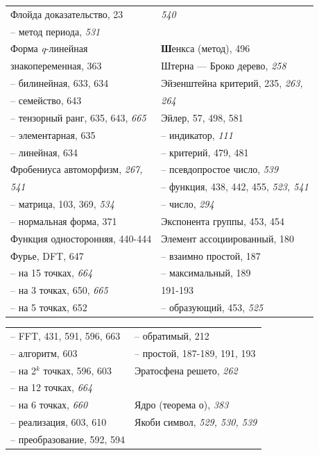 \documentclass{mai_book}
\begin{document}
{\begin{tabular}{ll}
	Флойда доказательство, 23 & \emph{540} \\
	 -- метод периода, \emph{531} & \\
	 Форма \emph{q}-линейная & \textbf{Ш}енкса (метод), 496\\
	 знакопеременная, 363 & Штерна — Броко дерево, \emph{258} \\
	 -- билинейная, 633, 634 & Эйзенштейна критерий, 235, \emph{263,} \\
	 -- семейство, 643 & \emph{264} \\
	 -- тензорный ранг, 635, 643, \emph{665} & Эйлер, 57, 498, 581 \\
	 -- элементарная, 635 & -- индикатор, \emph{111} \\
	 -- линейная, 634 & -- критерий, 479, 481 \\
     Фробениуса автоморфизм, \emph{267,} & -- псевдопростое число, \emph{539} \\
     \emph{541} & -- функция, 438, 442, 455, {\itshape 523, 541} \\
	 -- матрица, 103, 369, \emph{534} & -- число, \emph{294} \\
	 -- нормальная форма, 371 & Экспонента группы, 453, 454 \\
	 Функция односторонняя, 440-444 & Элемент ассоциированный, 180 \\
	 Фурье, DFT, 647 & -- взаимно простой, 187 \\
	 -- на 15 точках, \emph{664} & -- максимальный, 189 \\
	 -- на 3 точках, 650, \emph{665} & 191-193 \\
	 -- на 5 точках, 652 & -- образующий, 453, \emph{525} \\	         
\end{tabular}

\newpage
{}
\begin{tabular}{ll}
	-- FFT, 431, 591, 596, 663 & -- обратимый, 212 \\
	-- алгоритм, 603 & -- простой, 187-189, 191, 193 \\
	-- на 2$^{k}$ точках, 596, 603 & Эратосфена решето, \emph{262} \\
	-- на 12 точках, \emph{664} & \\
	-- на 6 точках, \emph{660} & Ядро (теорема о), \emph{383} \\
	-- реализация, 603, 610 & Якоби символ, {\itshape 529, 530, 539} \\
	-- преобразование, 592, 594 & \\
\end{tabular}

}
\end{document}
